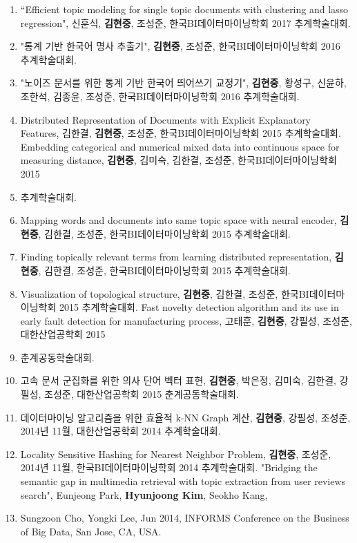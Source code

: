 \documentclass[11pt]{article}
\begin{document}
\begin{enumerate}
    \item “Efficient topic modeling for single topic documents with clustering and lasso regression", 신훈식, \textbf{김현중}, 조성준, 한국BI데이터마이닝학회 2017 추계학술대회.
    \item "통계 기반 한국어 명사 추출기", \textbf{김현중}, 조성준, 한국BI데이터마이닝학회 2016 추계학술대회.
    \item "노이즈 문서를 위한 통계 기반 한국어 띄어쓰기 교정기", \textbf{김현중}, 황성구, 신윤하, 조한석, 김종윤, 조성준, 한국BI데이터마이닝학회 2016 추계학술대회.
    \item Distributed Representation of Documents with Explicit Explanatory Features, 김한결, \textbf{김현중}, 조성준, 한국BI데이터마이닝학회 2015 추계학술대회.
    Embedding categorical and numerical mixed data into continuous space for measuring distance, \textbf{김현중}, 김미숙, 김한결, 조성준, 한국BI데이터마이닝학회 2015 \item 추계학술대회.
    \item Mapping words and documents into same topic space with neural encoder, \textbf{김현중}, 김한결, 조성준, 한국BI데이터마이닝학회 2015 추계학술대회.
    \item Finding topically relevant terms from learning distributed representation, \textbf{김현중}, 김한결, 조성준, 한국BI데이터마이닝학회 2015 추계학술대회.
    \item Visualization of topological structure, \textbf{김현중}, 김한결, 조성준, 한국BI데이터마이닝학회 2015 추계학술대회.
    Fast novelty detection algorithm and its use in early fault detection for manufacturing process, 고태훈, \textbf{김현중}, 강필성, 조성준, 대한산업공학회 2015 \item 춘계공동학술대회.
    \item 고속 문서 군집화를 위한 의사 단어 벡터 표현, \textbf{김현중}, 박은정, 김미숙, 김한결, 강필성, 조성준, 대한산업공학회 2015 춘계공동학술대회.
    \item 데이터마이닝 알고리즘을 위한 효율적 k-NN Graph 계산, \textbf{김현중}, 강필성, 조성준, 2014년 11월, 대한산업공학회 2014 추계학술대회.
    \item Locality Sensitive Hashing for Nearest Neighbor Problem, \textbf{김현중}, 조성준, 2014년 11월, 한국BI데이터마이닝학회 2014 추계학술대회.
    "Bridging the semantic gap in multimedia retrieval with topic extraction from user reviews search", Eunjeong Park, \textbf{Hyunjoong Kim}, Seokho Kang, \item Sungzoon Cho, Yongki Lee, Jun 2014, INFORMS Conference on the Business of Big Data, San Jose, CA, USA.

\end{enumerate}
\end{document}
